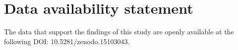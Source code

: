 \documentclass[a4paper,fleqn]{cas-dc}
\begin{document}
\section*{Data availability statement}
The data that support the findings of this study are openly available at the
following DOI: 10.5281/zenodo.15103043.

%





\end{document}
